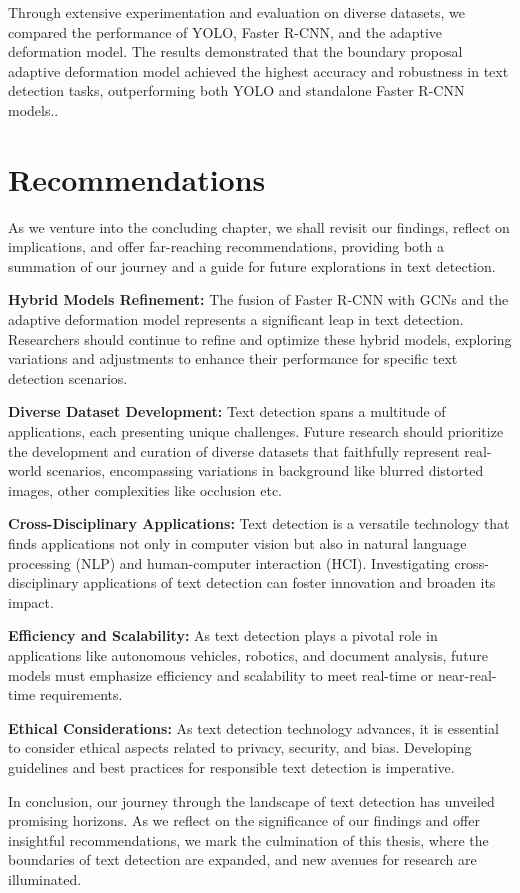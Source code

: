Through extensive experimentation and evaluation on diverse datasets, we compared the performance of YOLO, Faster R-CNN, and the adaptive deformation model. The results demonstrated that the boundary proposal adaptive deformation model achieved the highest accuracy and robustness in text detection tasks, outperforming both YOLO and standalone Faster R-CNN models..

\section{Recommendations}

As we venture into the concluding chapter, we shall revisit our findings, reflect on implications, and offer far-reaching recommendations, providing both a summation of our journey and a guide for future explorations in text detection.

\textbf{Hybrid Models Refinement:} The fusion of Faster R-CNN with GCNs and the adaptive deformation model represents a significant leap in text detection. Researchers should continue to refine and optimize these hybrid models, exploring variations and adjustments to enhance their performance for specific text detection scenarios.

\textbf{Diverse Dataset Development:} Text detection spans a multitude of applications, each presenting unique challenges. Future research should prioritize the development and curation of diverse datasets that faithfully represent real-world scenarios, encompassing variations in background like blurred distorted images, other complexities like occlusion etc.

\textbf{Cross-Disciplinary Applications:} Text detection is a versatile technology that finds applications not only in computer vision but also in natural language processing (NLP) and human-computer interaction (HCI). Investigating cross-disciplinary applications of text detection can foster innovation and broaden its impact.

\textbf{Efficiency and Scalability:} As text detection plays a pivotal role in applications like autonomous vehicles, robotics, and document analysis, future models must emphasize efficiency and scalability to meet real-time or near-real-time requirements.

\textbf{Ethical Considerations:} As text detection technology advances, it is essential to consider ethical aspects related to privacy, security, and bias. Developing guidelines and best practices for responsible text detection is imperative.

In conclusion, our journey through the landscape of text detection has unveiled promising horizons. As we reflect on the significance of our findings and offer insightful recommendations, we mark the culmination of this thesis, where the boundaries of text detection are expanded, and new avenues for research are illuminated.

\FloatBarrier

